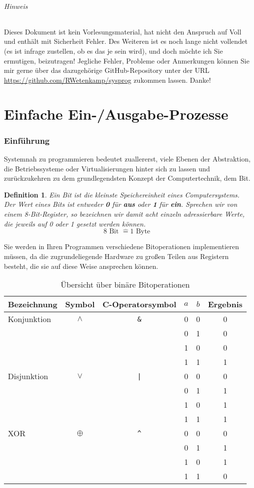 \documentclass[11pt,a4paper]{scrartcl}
\newtheorem{definition}{Definition}
\begin{document}
\paragraph{Hinweis}
Dieses Dokument ist kein Vorlesungsmaterial, hat nicht den Anspruch auf {Voll} und enthält mit Sicherheit Fehler. Des Weiteren ist es noch lange nicht vollendet (es ist infrage zustellen, ob es das je sein wird), und doch möchte ich Sie ermutigen, beizutragen! Jegliche Fehler, Probleme oder Anmerkungen können Sie mir gerne über das dazugehörige GitHub-Repository unter der URL \url{https://github.com/RWetenkamp/sysprog} zukommen lassen. Danke!
\pagebreak
\part{Einfache Ein-/Ausgabe-Prozesse}
\section{Einführung}
Systemnah zu programmieren bedeutet zuallererst, viele Ebenen der Abstraktion, die Betriebssysteme oder Virtualisierungen hinter sich zu lassen und zurückzukehren zu dem grundlegendsten Konzept der Computertechnik, dem Bit. \\
\begin{definition}
Ein Bit ist die kleinste Speichereinheit eines Computersystems. Der Wert eines Bits ist entweder \textbf{0} für \textbf{aus} oder \textbf{1} für \textbf{ein}. Sprechen wir von einem 8-Bit-Register, so bezeichnen wir damit acht einzeln adressierbare Werte, die jeweils auf 0 oder 1 gesetzt werden können. 
\[8 \text{ Bit } \widehat{=} 1 \text{ Byte }\]
\end{definition}

Sie werden in Ihren Programmen verschiedene Bitoperationen implementieren müssen, da die zugrundeliegende Hardware zu großen Teilen aus Registern besteht, die sie auf diese Weise ansprechen können.
\begin{table}[h]
\centering
\begin{tabular}{|l|c|c|c|c|c|}
\hline
Bezeichnung & Symbol & C-Operatorsymbol & $a$ & $b$ & Ergebnis \\
\hline
Konjunktion & $\land$ & \texttt{\&} & 0 & 0 & 0 \\
&&&0 & 1 & 0 \\
&&&1 & 0 & 0 \\
&&&1 & 1 & 1 \\
\hline
Disjunktion & $\lor$ & \texttt{|} & 0 & 0 & 0 \\
&&&0 & 1 & 1 \\
&&&1 & 0 & 1 \\
&&&1 & 1 & 1 \\
\hline
XOR & $\oplus$ & \texttt{\^} & 0 & 0 & 0 \\
&&&0 & 1 & 1 \\
&&&1 & 0 & 1 \\
&&&1 & 1 & 0 \\
\hline
\end{tabular}
\caption{Übersicht über binäre Bitoperationen}
\end{table} \\
\end{document}
